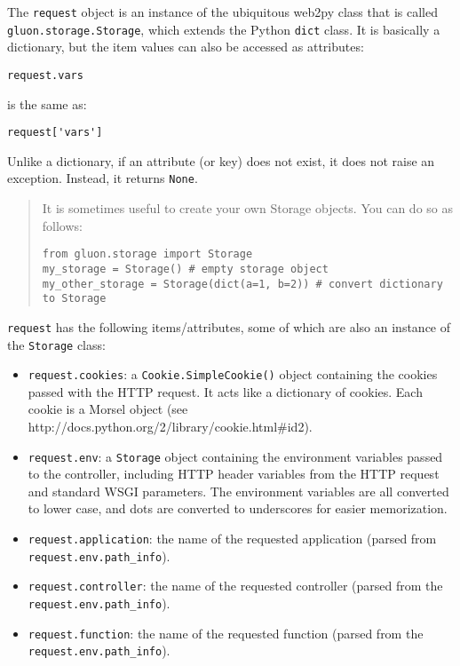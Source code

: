 \documentclass[justified,sixbynine,notoc]{tufte-book}
\def\ft{\small\tt}
\begin{document}
\begin{fullwidth}
The {\ft request} object is an instance of the ubiquitous web2py class that is called {\ft gluon.storage.Storage}, which extends the Python {\ft dict} class. It is basically a dictionary, but the item values can also be accessed as attributes:
\begin{lstlisting}
request.vars
\end{lstlisting}
\noindent is the same as:
\begin{lstlisting}
request['vars']
\end{lstlisting}

Unlike a dictionary, if an attribute (or key) does not exist, it does not raise an exception. Instead, it returns {\ft None}.

\begin{quote}It is sometimes useful to create your own Storage objects. You can do so as follows:
\begin{lstlisting}
from gluon.storage import Storage
my_storage = Storage() # empty storage object
my_other_storage = Storage(dict(a=1, b=2)) # convert dictionary to Storage
\end{lstlisting}\end{quote}
{\ft request} has the following items/attributes, some of which are also an instance of the {\ft Storage} class:
\begin{itemize}
\item {\ft request.cookies}: a {\ft Cookie.SimpleCookie()} object containing the cookies passed with the HTTP request. It acts like a dictionary of cookies. Each cookie is a Morsel object (see http://docs.python.org/2/library/cookie.html\#id2).

\item {\ft request.env}: a {\ft Storage} object containing the environment variables passed to the controller, including HTTP header variables from the HTTP request and standard WSGI parameters. The environment variables are all converted to lower case, and dots are converted to underscores for easier memorization.

\item {\ft request.application}: the name of the requested application (parsed from {\ft request.env.path\_info}).

\item {\ft request.controller}: the name of the requested controller (parsed from the {\ft request.env.path\_info}).

\item {\ft request.function}: the name of the requested function (parsed from the {\ft request.env.path\_info}).


\end{itemize}
\end{fullwidth}
\end{document}
